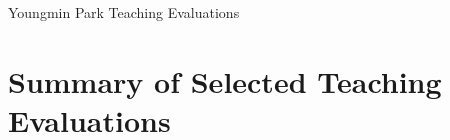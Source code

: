 \documentclass[a4paper,11pt]{article}
\begin{document}
\begin{center}
\Large Youngmin Park Teaching Evaluations
\end{center}



\section{Summary of Selected Teaching Evaluations}



 
\end{document}
